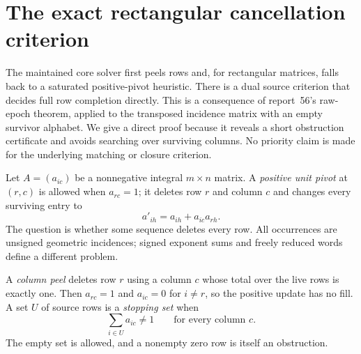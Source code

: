 \section{The exact rectangular cancellation criterion}
\label{sec:column-peeling}

The maintained core solver first peels rows and, for rectangular matrices,
falls back to a saturated positive-pivot heuristic.  There is a dual source
criterion that decides full row completion directly.  This is a consequence
of report~56's raw-epoch theorem\cite{raw-epoch-56}, applied to the transposed incidence matrix
with an empty survivor alphabet.  We give a direct proof because it reveals
a short obstruction certificate and avoids searching over surviving columns.
No priority claim is made for the underlying matching or closure criterion.

Let $A=(a_{ic})$ be a nonnegative integral $m\times n$ matrix.  A
\emph{positive unit pivot} at $(r,c)$ is allowed when $a_{rc}=1$; it deletes
row $r$ and column $c$ and changes every surviving entry to
\[
 a'_{ih}=a_{ih}+a_{ic}a_{rh}.
\]
The question is whether some sequence deletes every row.  All occurrences
are unsigned geometric incidences; signed exponent sums and freely reduced
words define a different problem.

A \emph{column peel} deletes row $r$ using a column $c$ whose total over
the live rows is exactly one.  Then $a_{rc}=1$ and $a_{ic}=0$ for $i\ne r$,
so the positive update has no fill.  A set $U$ of source rows is a
\emph{stopping set} when
\[
              \sum_{i\in U}a_{ic}\ne1\qquad\text{for every column }c.
\]
The empty set is allowed, and a nonempty zero row is itself an obstruction.

